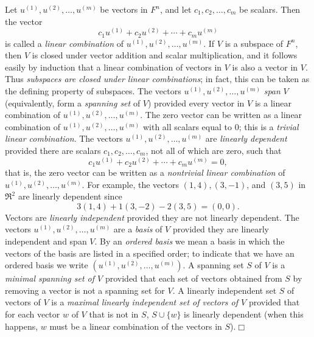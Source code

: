 \begin{definition}\label{1def:linearcomb}{\rm
Let $u^{(1)},u^{(2)},\ldots,u^{(m)}$ be vectors in $F^n$, and let 
$c_1,c_2,\ldots,c_m$ be scalars. Then the vector
\[c_1u^{(1)}+c_2u^{(2)}+\cdots+c_mu^{(m)}\]
is called a {\it linear combination}  of $u^{(1)},u^{(2)},\ldots,u^{(m)}$.
If $V$ is a subspace of $F^n$, then $V$ is closed under vector addition and 
scalar multiplication, and it follows easily by induction that a 
linear combination of vectors in $V$ is also a vector in $V$. Thus 
{\it subspaces 
are closed under linear combinations}; in fact, this can be taken as the 
defining property of subspaces.
The vectors $u^{(1)},u^{(2)},\ldots,u^{(m)}$ {\it span} $V$ 
(equivalently, form a {\it spanning set} of $V$) provided every vector in 
$V$ 
is a linear combination of $u^{(1)},u^{(2)},\ldots,u^{(m)}$. The zero 
vector can be written as a linear combination of 
$u^{(1)},u^{(2)},\ldots,u^{(m)}$ with all scalars equal to 0; this is a 
{\it trivial linear combination}. The vectors
$u^{(1)},u^{(2)},\ldots,u^{(m)}$ are {\it linearly dependent} provided 
there are scalars $c_1,c_2,\ldots,c_m$, not all of which are zero, such 
that
\[c_1u^{(1)}+c_2u^{(2)}+\cdots+c_mu^{(m)}=0,\]
that is, the zero vector can be written as a {\it nontrivial linear  
combination} of $u^{(1)},u^{(2)},\ldots,u^{(m)}$.
For example, the vectors $(1,4), (3,-1)$, and $(3,5)$ in $\Re^2$ are 
linearly 
dependent since
\[3(1,4)+1(3,-2)-2(3,5)=(0,0).\] Vectors are {\it linearly independent} provided  they are not linearly dependent.
The vectors 
$u^{(1)},u^{(2)},\ldots,u^{(m)}$ are a {\it basis}  of $V$ provided they are  
linearly independent and span $V$.
By an {\it ordered basis}  we mean a basis in which the vectors of the basis are listed 
in a specified order; to indicate that we have an ordered basis we write
$(u^{(1)},u^{(2)},\ldots,u^{(m)})$. 
A spanning set $S$ of $V$ is a  {\it minimal spanning set of $V$} provided that
each set 
of vectors obtained from $S$ by removing a vector is not a spanning set 
for $V$.
A linearly independent set $S$ of vectors of $V$ is a {\it maximal linearly 
independent set of vectors of $V$} provided that for each vector $w$ of 
$V$ that 
is not in $S$, $S\cup\{w\}$ is  linearly dependent (when this happens, 
$w$ must be  a linear combination of the vectors in 
$S$).\hfill{$\Box$}
}\end{definition}

